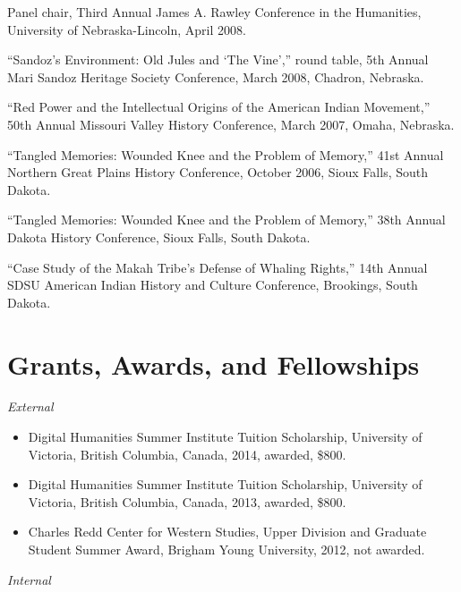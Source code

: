 Panel chair, Third Annual James A. Rawley Conference in the Humanities,
University of Nebraska-Lincoln, April 2008.

``Sandoz's Environment: Old Jules and `The Vine','' round table, 5th
Annual Mari Sandoz Heritage Society Conference, March 2008, Chadron,
Nebraska.

``Red Power and the Intellectual Origins of the American Indian
Movement,'' 50th Annual Missouri Valley History Conference, March 2007,
Omaha, Nebraska.

``Tangled Memories: Wounded Knee and the Problem of Memory,'' 41st
Annual Northern Great Plains History Conference, October 2006, Sioux
Falls, South Dakota.

``Tangled Memories: Wounded Knee and the Problem of Memory,'' 38th
Annual Dakota History Conference, Sioux Falls, South Dakota.

``Case Study of the Makah Tribe's Defense of Whaling Rights,'' 14th
Annual SDSU American Indian History and Culture Conference, Brookings,
South Dakota.

\section{Grants, Awards, and
Fellowships}\label{grants-awards-and-fellowships}

\emph{External}

\begin{itemize}
\tightlist
\item
  Digital Humanities Summer Institute Tuition Scholarship, University of
  Victoria, British Columbia, Canada, 2014, awarded, \$800.
\item
  Digital Humanities Summer Institute Tuition Scholarship, University of
  Victoria, British Columbia, Canada, 2013, awarded, \$800.
\item
  Charles Redd Center for Western Studies, Upper Division and Graduate
  Student Summer Award, Brigham Young University, 2012, not awarded.
\end{itemize}

\emph{Internal}

